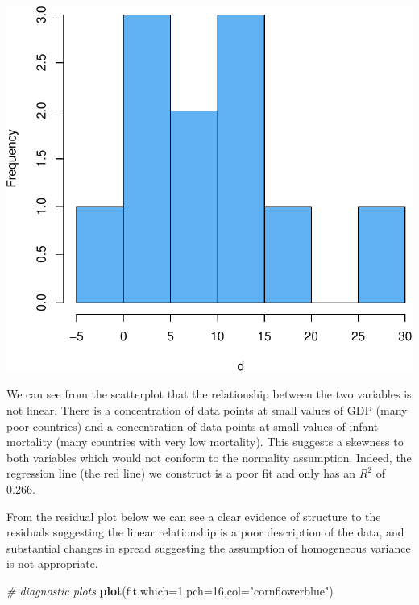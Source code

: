 \documentclass[
]{article}
\newenvironment{Shaded}{\begin{snugshade}}{\end{snugshade}}
\newcommand{\AttributeTok}[1]{\textcolor[rgb]{0.13,0.29,0.53}{#1}}
\newcommand{\CommentTok}[1]{\textcolor[rgb]{0.56,0.35,0.01}{\textit{#1}}}
\newcommand{\DecValTok}[1]{\textcolor[rgb]{0.00,0.00,0.81}{#1}}
\newcommand{\FunctionTok}[1]{\textcolor[rgb]{0.13,0.29,0.53}{\textbf{#1}}}
\newcommand{\NormalTok}[1]{#1}
\newcommand{\SpecialCharTok}[1]{\textcolor[rgb]{0.81,0.36,0.00}{\textbf{#1}}}
\newcommand{\StringTok}[1]{\textcolor[rgb]{0.31,0.60,0.02}{#1}}
\begin{document}
\begin{Shaded}
\end{Shaded}

\begin{center}\includegraphics[width=0.6\linewidth,height=0.6\textheight]{unnamed-chunk-59-1} \end{center}

We can see from the scatterplot that the relationship between the two
variables is not linear. There is a concentration of data points at
small values of GDP (many poor countries) and a concentration of data
points at small values of infant mortality (many countries with very low
mortality). This suggests a skewness to both variables which would not
conform to the normality assumption. Indeed, the regression line (the
red line) we construct is a poor fit and only has an \(R^2\) of 0.266.

From the residual plot below we can see a clear evidence of structure to
the residuals suggesting the linear relationship is a poor description
of the data, and substantial changes in spread suggesting the assumption
of homogeneous variance is not appropriate.

\begin{Shaded}
\begin{Highlighting}[]
\CommentTok{\# diagnostic plots }
\FunctionTok{plot}\NormalTok{(fit,}\AttributeTok{which=}\DecValTok{1}\NormalTok{,}\AttributeTok{pch=}\DecValTok{16}\NormalTok{,}\AttributeTok{col=}\StringTok{"cornflowerblue"}\NormalTok{)}
\end{Highlighting}
\end{Shaded}
\end{document}
